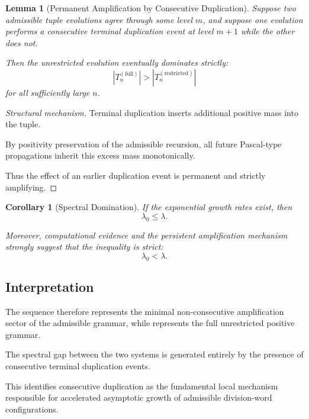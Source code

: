 \documentclass[12pt, oneside]{article}
\numberwithin{equation}{section}
\theoremstyle{definition}
\theoremstyle{plain}
\newtheorem{lemma}[theorem]{Lemma}
\newtheorem{corollary}[theorem]{Corollary}
\theoremstyle{remark}
\begin{document}

\begin{lemma}[Permanent Amplification by Consecutive Duplication]
\label{lem:permanent-amplification}
Suppose two admissible tuple evolutions agree through some level \(m\),
and suppose one evolution performs a consecutive terminal duplication
event at level \(m+1\) while the other does not.

Then the unrestricted evolution eventually dominates strictly:
\[
|T_n^{(\mathrm{full})}|
>
|T_n^{(\mathrm{restricted})}|
\]
for all sufficiently large \(n\).
\end{lemma}

\begin{proof}[Structural mechanism]
Terminal duplication inserts additional positive mass into the tuple.

By positivity preservation of the admissible recursion, all future
Pascal-type propagations inherit this excess mass monotonically.

Thus the effect of an earlier duplication event is permanent and
strictly amplifying.
\end{proof}

\begin{corollary}[Spectral Domination]
If the exponential growth rates exist, then
\[
\lambda_0 \le \lambda.
\]

Moreover, computational evidence and the persistent amplification
mechanism strongly suggest that the inequality is strict:
\[
\lambda_0 < \lambda.
\]
\end{corollary}

\subsection{Interpretation}

The sequence  therefore represents the minimal
non-consecutive amplification sector of the admissible grammar, while
 represents the full unrestricted positive grammar.

The spectral gap between the two systems is generated entirely by the
presence of consecutive terminal duplication events.

This identifies consecutive duplication as the fundamental local
mechanism responsible for accelerated asymptotic growth of admissible
division-word configurations.
\end{document}
